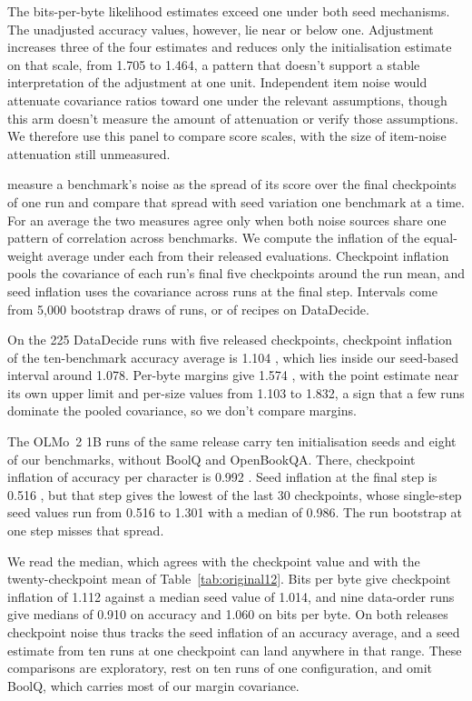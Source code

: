 The bits-per-byte likelihood estimates exceed one under both seed mechanisms. The unadjusted accuracy values, however, lie near or below one. Adjustment increases three of the four estimates and reduces only the initialisation estimate on that scale, from 1.705 to 1.464, a pattern that doesn't support a stable interpretation of the adjustment at one unit. Independent item noise would attenuate covariance ratios toward one under the relevant assumptions, though this arm doesn't measure the amount of attenuation or verify those assumptions. We therefore use this panel to compare score scales, with the size of item-noise attenuation still unmeasured.

\label{app:heineman}
\citet{heineman2025} measure a benchmark's noise as the spread of its score over the final checkpoints of one run and compare that spread with seed variation one benchmark at a time. For an average the two measures agree only when both noise sources share one pattern of correlation across benchmarks. We compute the inflation of the equal-weight average under each from their released evaluations. Checkpoint inflation pools the covariance of each run's final five checkpoints around the run mean, and seed inflation uses the covariance across runs at the final step. Intervals come from 5,000 bootstrap draws of runs, or of recipes on DataDecide.

On the 225 DataDecide runs with five released checkpoints, checkpoint inflation of the ten-benchmark accuracy average is 1.104 , which lies inside our seed-based interval around 1.078. Per-byte margins give 1.574 , with the point estimate near its own upper limit and per-size values from 1.103 to 1.832, a sign that a few runs dominate the pooled covariance, so we don't compare margins.

The OLMo~2 1B runs of the same release carry ten initialisation seeds and eight of our benchmarks, without BoolQ and OpenBookQA. There, checkpoint inflation of accuracy per character is 0.992 . Seed inflation at the final step is 0.516 , but that step gives the lowest of the last 30 checkpoints, whose single-step seed values run from 0.516 to 1.301 with a median of 0.986. The run bootstrap at one step misses that spread.

We read the median, which agrees with the checkpoint value and with the twenty-checkpoint mean of Table~\ref{tab:original12}. Bits per byte give checkpoint inflation of 1.112  against a median seed value of 1.014, and nine data-order runs give medians of 0.910 on accuracy and 1.060 on bits per byte. On both releases checkpoint noise thus tracks the seed inflation of an accuracy average, and a seed estimate from ten runs at one checkpoint can land anywhere in that range. These comparisons are exploratory, rest on ten runs of one configuration, and omit BoolQ, which carries most of our margin covariance.

